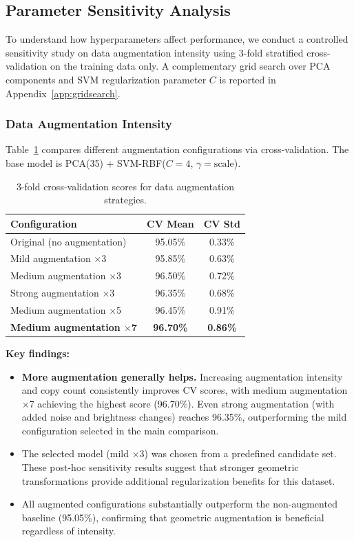 \documentclass[11pt,a4paper,twocolumn]{article}
\begin{document}
\subsection{Parameter Sensitivity Analysis}

To understand how hyperparameters affect performance, we conduct a controlled sensitivity study on data augmentation intensity using 3-fold stratified cross-validation on the training data only. A complementary grid search over PCA components and SVM regularization parameter $C$ is reported in Appendix~\ref{app:gridsearch}.

\subsubsection{Data Augmentation Intensity}

Table~\ref{tab:augmentation-cv} compares different augmentation configurations via cross-validation. The base model is PCA(35) + SVM-RBF($C=4$, $\gamma=\text{scale}$).

\begin{table}[H]
\centering
\caption{3-fold cross-validation scores for data augmentation strategies.}
\label{tab:augmentation-cv}
\setlength{\tabcolsep}{3pt}
\footnotesize
\begin{tabular}{@{}lcc@{}}
\toprule
\textbf{Configuration} & \textbf{CV Mean} & \textbf{CV Std} \\
\midrule
Original (no augmentation) & 95.05\% & 0.33\% \\
Mild augmentation $\times$3 & 95.85\% & 0.63\% \\
Medium augmentation $\times$3 & 96.50\% & 0.72\% \\
Strong augmentation $\times$3 & 96.35\% & 0.68\% \\
Medium augmentation $\times$5 & 96.45\% & 0.91\% \\
\textbf{Medium augmentation $\times$7} & \textbf{96.70\%} & \textbf{0.86\%} \\
\bottomrule
\end{tabular}
\end{table}

\textbf{Key findings:}
\begin{itemize}[noitemsep]
    \item \textbf{More augmentation generally helps.} Increasing augmentation intensity and copy count consistently improves CV scores, with medium augmentation $\times$7 achieving the highest score (96.70\%). Even strong augmentation (with added noise and brightness changes) reaches 96.35\%, outperforming the mild configuration selected in the main comparison.
    \item The selected model (mild $\times$3) was chosen from a predefined candidate set. These post-hoc sensitivity results suggest that stronger geometric transformations provide additional regularization benefits for this dataset.
    \item All augmented configurations substantially outperform the non-augmented baseline (95.05\%), confirming that geometric augmentation is beneficial regardless of intensity.
\end{itemize}
\end{document}
